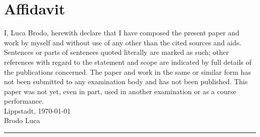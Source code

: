 

\newcommand*{\mytitle}{Weed management in sugar beet farms: Quo Vadis?} %
\newcommand*{\myinstitute}{Hamm-Lippstadt University of Applied Sciences} %


\newcommand*{\myauthor}{Brodo Luca} %
\newcommand*{\myreporttype}{Project Work} %
\newcommand*{\mygraduation}{Electronic Engineering} %



\newcommand*{\firstexaminer}{Prof. Dr. Stefan Henkler} %
\newcommand*{\secondexaminer}{Dipl-Ing Kristian Rother} %
\newcommand*{\mydate}{\today} %





\pagestyle{empty}

\newpage 					%
\thispagestyle{empty}
\quad 
\newpage
 
\cleardoubleoddpage


\chapter*{Affidavit}%
I, Luca Brodo, herewith declare that I have composed the present paper and work by myself and without use of any other than the cited sources and aids. Sentences or parts of sentences quoted literally are marked as such; other references with regard to the statement and scope are indicated by full details of the publications concerned. The paper and work in the same or similar form has not been submitted to any examination body and has not been published. This paper was not yet, even in part, used in another examination or as a course performance.\\
Lippstadt, \today\\[.6cm]
Brodo Luca\\
\rule[0.5em]{20em}{0.5pt}


\renewcommand*\listfigurename{List of Figures}
\renewcommand*\contentsname{Table of Content}
\renewcommand*\listtablename{List of Tables}
\tableofcontents			%
\listoffigures				%
\listoftables				%
\renewcommand{\figurename}{Fig.}


